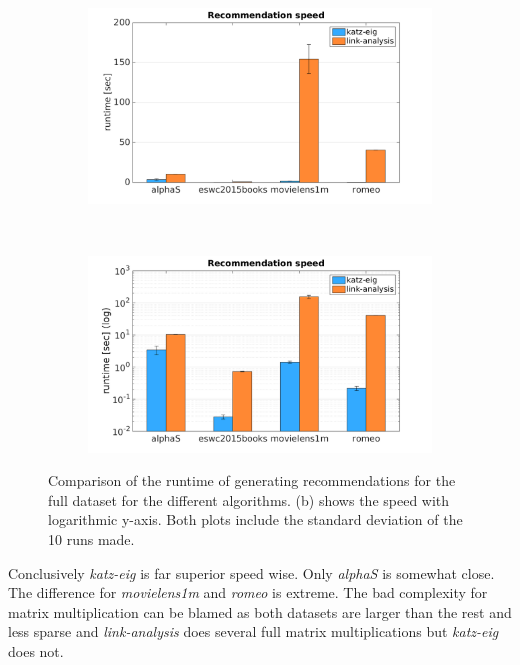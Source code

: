\begin{figure}[h!]
    \begin{subfigure}[h!]{0.5\textwidth}
        \includegraphics[width=\textwidth]{fig/comp/comp_rec_speed.png}
        \caption{}
    \end{subfigure}
    ~
    \begin{subfigure}[h!]{0.5\textwidth}
        \includegraphics[width=\textwidth]{fig/comp/comp_rec_speed_log.png}
        \caption{}
    \end{subfigure}
    \caption{Comparison of the runtime of generating recommendations for the full dataset for the different algorithms. (b) shows the speed with logarithmic y-axis. Both plots include the standard deviation of the 10 runs made.}
    \label{fig:rec_speed}
\end{figure}

Conclusively \textit{katz-eig} is far superior speed wise. Only \textit{alphaS} is somewhat close. The difference for \textit{movielens1m} and \textit{romeo} is extreme. The bad complexity for matrix multiplication can be blamed as both datasets are larger than the rest and less sparse and \textit{link-analysis} does several full matrix multiplications but \textit{katz-eig} does not.

